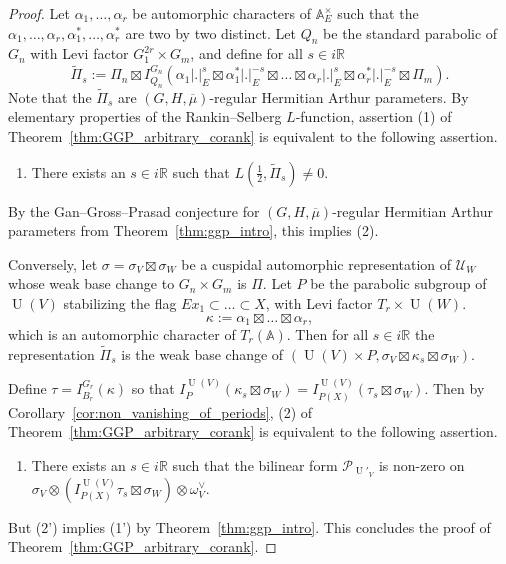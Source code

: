 \documentclass[10pt,a4paper]{amsart}
\newcommand{\R}{\mathbb{R}}
\DeclareMathOperator{\U}{U}
\newcommand{\bA}{\mathbb{A}}
\newcommand{\cP}{\mathcal{P}}
\newcommand{\cU}{\mathcal{U}}
\newcommand{\valP}[1]{\left|#1\right|}
\begin{document}
\begin{proof}
    Let $\alpha_1, \hdots, \alpha_r$ be automorphic characters of $\bA_E^\times$ such that the $\alpha_1, \hdots, \alpha_r, \alpha_1^*, \hdots, \alpha_r^*$ are two by two distinct. Let $Q_n$ be the standard parabolic of $G_n$ with Levi factor $G_1^{2r} \times G_m$, and define for all $s \in i \R$
    \begin{equation*}
        \widetilde{\Pi}_s:= \Pi_n \boxtimes I_{Q_n}^{G_n}( \alpha_1\valP{.}^s_E \boxtimes \alpha_1^*\valP{.}^{-s}_E \boxtimes \hdots \boxtimes \alpha_r\valP{.}^s_E \boxtimes \alpha_r^*\valP{.}^{-s}_E \boxtimes \Pi_m ).
    \end{equation*}
    Note that the $\widetilde{\Pi}_s$ are $(G,H,\overline{\mu})$-regular Hermitian Arthur parameters. By elementary properties of the Rankin--Selberg $L$-function, assertion (1) of Theorem~\ref{thm:GGP_arbitrary_corank} is equivalent to the following assertion.
    \begin{enumerate}
        \item[(1')] There exists an $s \in i\R$ such that $L(\frac{1}{2},\widetilde{\Pi}_s) \neq 0$. 
    \end{enumerate}
    By the Gan--Gross--Prasad conjecture for $(G,H,\overline{\mu})$-regular Hermitian Arthur parameters from Theorem~\ref{thm:ggp_intro}, this implies (2). 
    
    Conversely, let $\sigma=\sigma_V \boxtimes \sigma_W$ be a cuspidal automorphic representation of $\cU_W$ whose weak base change to $G_n \times G_m$ is $\Pi$. Let $P$ be the parabolic subgroup of $\U(V)$ stabilizing the flag $E x_1 \subset \hdots \subset X$, with Levi factor $T_r \times \U(W)$. 
    \begin{equation}
        \label{eq:kappa_defi}
    \kappa:=\alpha_1 \boxtimes \hdots \boxtimes \alpha_r,
    \end{equation}
    which is an automorphic character of $T_r(\bA)$.
    Then for all $s \in i \R$ the representation $\widetilde{\Pi}_s$ is the weak base change of $(\U(V) \times P,  \sigma_V \boxtimes \kappa_s \boxtimes \sigma_W)$.
    
    Define $\tau=I_{B_r}^{G_r}(\kappa)$ so that $I_P^{\U(V)}(\kappa_s \boxtimes \sigma_W)=I_{P(X)}^{\U(V)} (\tau_s \boxtimes \sigma_W)$. Then by Corollary~\ref{cor:non_vanishing_of_periods}, (2) of Theorem~\ref{thm:GGP_arbitrary_corank} is equivalent to the following assertion.
    \begin{enumerate}
        \item[(2')] There exists an $s \in i \R$ such that the bilinear form $\cP_{\U'_V}$ is non-zero on $\sigma_V \otimes (I_{P(X)}^{\U(V)} \tau_s \boxtimes \sigma_W) \otimes \omega^\vee_{V}$.
    \end{enumerate}
    But (2') implies (1') by Theorem~\ref{thm:ggp_intro}. This concludes the proof of Theorem~\ref{thm:GGP_arbitrary_corank}.

\end{proof}
\end{document}
